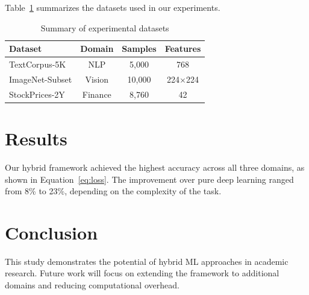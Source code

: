 \documentclass[12pt]{article}
\begin{document}
Table~\ref{tab:datasets} summarizes the datasets used in our experiments.

\begin{table}[h]
\centering
\caption{Summary of experimental datasets}
\label{tab:datasets}
\begin{tabular}{lccc}
\hline
\textbf{Dataset} & \textbf{Domain} & \textbf{Samples} & \textbf{Features} \\
\hline
TextCorpus-5K & NLP & 5,000 & 768 \\
ImageNet-Subset & Vision & 10,000 & 224$\times$224 \\
StockPrices-2Y & Finance & 8,760 & 42 \\
\hline
\end{tabular}
\end{table}

\section{Results}

Our hybrid framework achieved the highest accuracy across all three domains, as shown in Equation~\ref{eq:loss}. The improvement over pure deep learning ranged from 8\% to 23\%, depending on the complexity of the task.

\section{Conclusion}

This study demonstrates the potential of hybrid ML approaches in academic research. Future work will focus on extending the framework to additional domains and reducing computational overhead.



\end{document}
